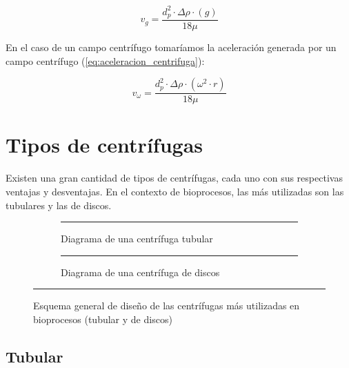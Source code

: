 \documentclass{AsignaturaResumen}
\begin{document}
\begin{equation}\label{eq:velocidad_de_sedimentacion_en_campo_gravitacional}
    v_{g} = \frac{d_{p}^{2}\cdot\Delta\rho\cdot(g)}{18\mu}
\end{equation}

En el caso de un campo centrífugo tomaríamos la aceleración generada por un campo centrífugo (\autoref{eq:aceleracion_centrifuga}):

\begin{equation}\label{eq:velocidad_de_sedimentacion_en_campo_centrifugo}
    v_{\omega} = \frac{d_{p}^{2}\cdot\Delta\rho\cdot(\omega^{2}\cdot r)}{18\mu}
\end{equation}



\section{Tipos de centrífugas}

Existen una gran cantidad de tipos de centrífugas, cada uno con sus respectivas ventajas y desventajas. En el contexto de bioprocesos, las más utilizadas son las tubulares y las de discos.

\begin{figure}
    \begin{subfigure}[t]{0.425\linewidth}\centering
        \resizebox{\linewidth}{!}{}
        \rule{\linewidth}{0.5pt}
        \caption{Diagrama de una centrífuga tubular}
        \label{fig:centrífuga_tubular}
    \end{subfigure}
    \hfill
    \begin{subfigure}[t]{0.525\linewidth}\centering
        \resizebox{\linewidth}{!}{}
        \rule{\linewidth}{0.5pt}
        \caption{Diagrama de una centrífuga de discos}
        \label{fig:centrifuga_de_discos}
    \end{subfigure}
    
    \vspace{12pt}
    \rule{\linewidth}{0.5pt}
    \caption{Esquema general de diseño de las centrífugas más utilizadas en bioprocesos (tubular y de discos)}
    \label{fig:diseño_de_centrifugas_convencionales}
\end{figure}



\subsection{Tubular}
\end{document}
